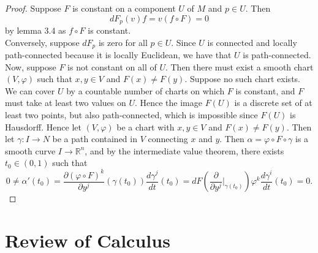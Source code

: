 \documentclass[reqno]{amsart}
\theoremstyle{plain}%
\theoremstyle{definition}
\theoremstyle{remark}
\begin{document}
    \begin{proof}
        Suppose $F$ is constant on a component $U$ of $M$ and $p \in U$.
        Then 
        \[
        dF_p (v) f = v \left( f \circ F \right) = 0
        \] 
        by lemma 3.4 as $f \circ F$ is constant.\\
        Conversely, suppose $dF_p$ is zero for all $p \in U$. Since $U$ is
        connected and locally path-connected because it is locally Euclidean,
        we have that $U$ is path-connected. Now, suppose $F$ is not constant
        on all of $U$. Then there must exist a smooth chart $\left( V, \varphi \right) $ 
        such that $x,y \in V$ and $F(x) \neq F(y)$. Suppose no such chart
        exists. We can cover $U$ by a countable number of charts on which
        $F$ is constant, and $F$ must take at least two values on
        $U$. Hence the image $F(U)$ is a discrete set of at least two points,
        but also path-connected, which is impossible since  $F(U)$ is
        Hausdorff. Hence let $\left( V, \varphi \right) $ be a chart 
        with $x,y \in V$ and $F(x) \neq  F(y)$. Then
        let $\gamma  \colon I \to N$ be a path contained in $V$ connecting
        $x$ and $y$. Then $ \alpha  = \varphi \circ F \circ \gamma$ is a 
        smooth curve  $I \to \mathbb{R}^{n}$, and by the intermediate value
        theorem, there exists $t_0 \in \left( 0,1 \right) $ such that
        \[
        0 \neq \alpha' (t_0) =
        \frac{\partial \left( \varphi \circ F \right)^{k} }{\partial y^{j}} 
        (\gamma(t_0))
        \frac{d \gamma^{j}}{d t} (t_0)
        = d F \left( \frac{\partial}{\partial y^{j}}|_{\gamma(t_0)} \right)
        \varphi^{k} \frac{d \gamma^{i}}{dt}(t_0)
        = 0.
        \] 
        


    \end{proof}

    



\newpage
\appendix
\section{Review of Calculus}
\end{document}
